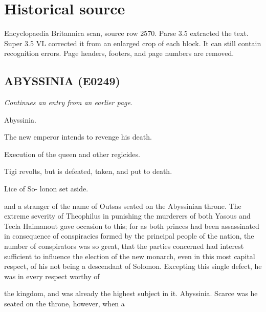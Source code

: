 \documentclass{article}
\begin{document}
\section*{Historical source}
Encyclopaedia Britannica scan, source row 2570. Parse 3.5 extracted the text. Super 3.5 VL corrected it from an enlarged crop of each block. It can still contain recognition errors.
Page headers, footers, and page numbers are removed.

\subsection*{ABYSSINIA (E0249)}
\textit{Continues an entry from an earlier page.}

Abyssinia.

The new emperor intends to revenge his death.

Execution of the queen and other regicides.

Tigi revolts, but is defeated, taken, and put to death.

Lice of So- lonon set aside.

and a stranger of the name of Outsas seated on the Abyssinian throne. The extreme severity of Theophilus in punishing the murderers of both Yasous and Tecla Haimanout gave occasion to this; for as both princes had been assassinated in consequence of conspiracies formed by the principal people of the nation, the number of conspirators was so great, that the parties concerned had interest sufficient to influence the election of the new monarch, even in this most capital respect, of his not being a descendant of Solomon. Excepting this single defect, he was in every respect worthy of

the kingdom, and was already the highest subject in it. Abyssinia. Scarce was he seated on the throne, however, when a
\end{document}
